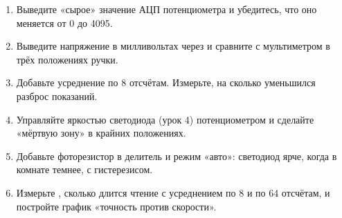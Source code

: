 \begin{tasks}
\begin{enumerate}
\item {} Выведите «сырое» значение АЦП потенциометра и убедитесь, что оно меняется от 0 до 4095.
\item {} Выведите напряжение в милливольтах через  и сравните с мультиметром в трёх положениях ручки.
\item {} Добавьте усреднение по 8 отсчётам. Измерьте, на сколько уменьшился разброс показаний.
\item {} Управляйте яркостью светодиода (урок 4) потенциометром и сделайте «мёртвую зону» в крайних положениях.
\item {} Добавьте фоторезистор в делитель и режим «авто»: светодиод ярче, когда в комнате темнее, с гистерезисом.
\item {} Измерьте , сколько длится чтение с усреднением по 8 и по 64 отсчётам, и постройте график «точность против скорости».
\end{enumerate}
\end{tasks}
